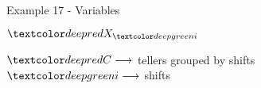 \begin{frame}{Example 17 - Variables}
\begin{center}
\Huge{
$\colora{X}_{\colorb{i}}$ \\
}
\end{center}
\LARGE{
$\colora{C} \longrightarrow$
    tellers grouped by shifts \\
$\colorb{i} \longrightarrow$
    shifts
}
\end{frame}
